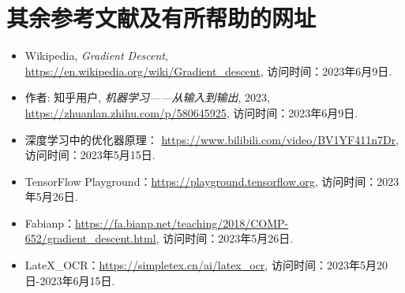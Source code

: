 \documentclass[printMode=false, declarePage=false]{ecnuthesis}
\begin{document}
\PrintReference

\newpage

\section*{其余参考文献及有所帮助的网址}

\begin{itemize}
    \item Wikipedia, \textit{Gradient Descent}, \url{https://en.wikipedia.org/wiki/Gradient_descent}, 访问时间：2023年6月9日.
    \item 作者: 知乎用户, \textit{机器学习——从输入到输出}, 2023, \url{https://zhuanlan.zhihu.com/p/580645925}, 访问时间：2023年6月9日.
    \item 深度学习中的优化器原理： \url{https://www.bilibili.com/video/BV1YF411n7Dr}, 访问时间：2023年5月15日.
    \item TensorFlow Playground：\url{https://playground.tensorflow.org}, 访问时间：2023年5月26日.
    \item Fabianp：\url{https://fa.bianp.net/teaching/2018/COMP-652/gradient_descent.html}, 访问时间：2023年5月26日.
    \item LateX\_OCR：\url{https://simpletex.cn/ai/latex_ocr}, 访问时间：2023年5月20日-2023年6月15日.
\end{itemize}
\end{document}

